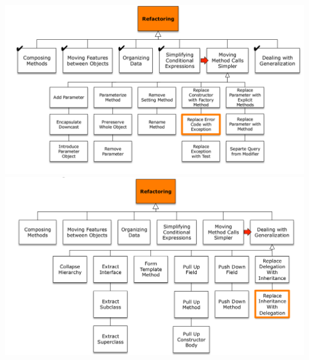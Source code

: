 \includegraphics[width=\linewidth]{images/refactoring_moving_method_calls.png}
\includegraphics[width=\linewidth]{images/refactoring_generalization.png}
\newpage

